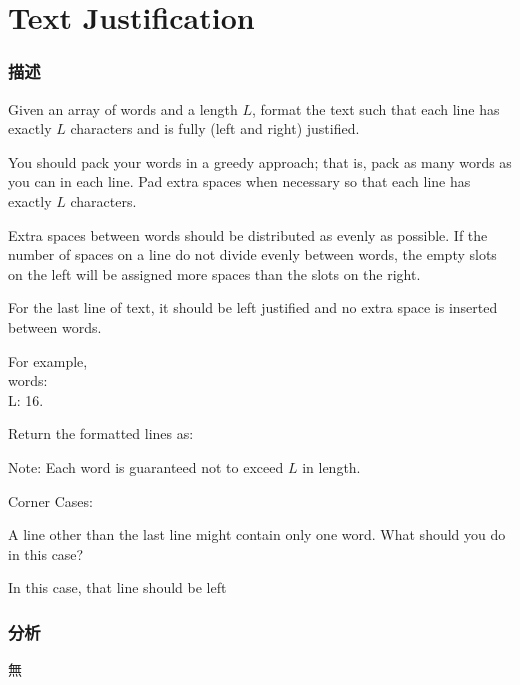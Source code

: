 \section{Text Justification} %
\label{sec:text-justification}


\subsubsection{描述}
Given an array of words and a length $L$, format the text such that each line has exactly $L$ characters and is fully (left and right) justified.

You should pack your words in a greedy approach; that is, pack as many words as you can in each line. Pad extra spaces  when necessary so that each line has exactly $L$ characters.

Extra spaces between words should be distributed as evenly as possible. If the number of spaces on a line do not divide evenly between words, the empty slots on the left will be assigned more spaces than the slots on the right.

For the last line of text, it should be left justified and no extra space is inserted between words.

For example, \\
words:  \\
L: 16.

Return the formatted lines as:
\begin{Code}
\end{Code}

Note: Each word is guaranteed not to exceed $L$ in length.

Corner Cases:
\begindot
\item A line other than the last line might contain only one word. What should you do in this case?
\item In this case, that line should be left
\myenddot


\subsubsection{分析}
無


